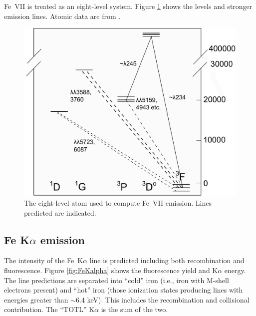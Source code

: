 Fe~VII is treated as an eight-level system.
Figure \ref{fig:Fe7_levels} shows the levels
and stronger emission lines.
Atomic data are from \citet{Berrington2000}.

\begin{figure}
\centering
\label{fig:Fe7_levels}
\includegraphics[scale=0.9]{Fe7_levels}
\caption[Fe~VII model atom]{The eight-level atom used to compute Fe~VII emission.  Lines
predicted are indicated.}
\end{figure}

\subsection{Fe K$\alpha$ emission}

The intensity of the Fe~K$\alpha$ line is predicted including both recombination
and fluorescence.  Figure \ref{fig:FeKalpha} shows the fluorescence yield and
K$\alpha$ energy.
The line predictions are separated into ``cold'' iron (i.e., iron with
M-shell electrons present) and ``hot'' iron (those ionization states
producing lines with energies greater than $\sim$6.4 keV).  This includes the
recombination and collisional contribution.  The ``TOTL'' K$\alpha$ is the sum of
the two.

